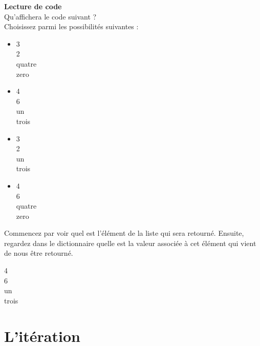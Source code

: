     \begin{Exercice}[15 minutes] \textbf{Lecture de code}\\
      	Qu'affichera le code suivant ? \\
      	
      	
      	
      	Choisissez parmi les possibilités suivantes :
      	
      	\begin{itemize}
      	\item 3 \\
      	2 \\
      	quatre \\
      	zero\\
      	\item 4 \\
      	6 \\
      	un \\
      	trois\\
      	\item 3 \\
      	2 \\
      	un \\
      	trois\\
      	\item 4 \\
      	6 \\
      	quatre \\
      	zero \\
      	\end{itemize}
    
        \begin{conseil}
           Commencez par voir quel est l'élément de la liste qui sera retourné. Ensuite, regardez dans le dictionnaire quelle est la valeur associée à cet élément qui vient de nous être retourné.		     
        \end{conseil}
        
        \begin{solution}
        4 \\
      	6 \\
      	un \\
      	trois
        \end{solution}
    \end{Exercice}
    
    \section{L'itération}
    
